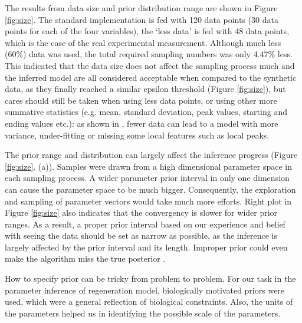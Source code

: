 The results from data size and prior distribution range are shown in Figure \ref{fig:size}. The standard implementation is fed with 120 data points (30 data points for each of the four variables), the `less data' is fed with 48 data points, which is the case of the real experimental measurement. Although much less (60\%) data was used, the total required sampling numbers was only 4.47\% less. This indicated that the data size does not affect the sampling process much and the inferred model are all considered acceptable when compared to the synthetic data, as they finally reached a similar epsilon threshold (Figure \ref{fig:size}), but cares should still be taken when using less data points, or using other more summative statistics (e.g. mean, standard deviation, peak values, starting and ending values etc.): as shown in \cite{ref:disease}, fewer data can lead to a model with more variance, under-fitting or missing some local features such as local peaks.

The prior range and distribution can largely affect the inference progress (Figure \ref{fig:size}. (a)). Samples were drawn from a high dimensional parameter space in each sampling process. A wider parameter prior interval in only one dimension can cause the parameter space to be much bigger. Consequently, the exploration and sampling of parameter vectors would take much more efforts. Right plot in Figure \ref{fig:size} also indicates that the convergency is slower for wider prior ranges. As a result, a proper prior interval based on our experience and belief with seeing the data should be set as narrow as possible, as the inference is largely affected by the prior interval and its length. Improper prior could even make the algorithm miss the true posterior \cite{ref:abcsysbio}.

How to specify prior can be tricky from problem to problem. For our task in the parameter inference of regeneration model, biologically motivated priors were used, which were a general reflection of biological constraints. Also, the units of the parameters helped us in identifying the possible scale of the parameters.




